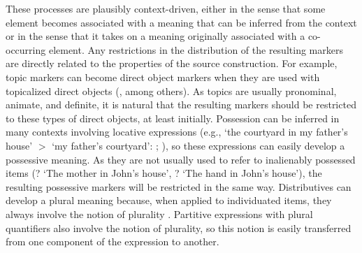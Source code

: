 \documentclass[output=paper]{langsci/langscibook}
\begin{document}
These processes are plausibly  context-driven, either in the sense that some element becomes associated
with a meaning that can be inferred  from the context or in the sense
that it takes on a meaning originally associated with a co-occurring
element. Any restrictions in the distribution of the resulting markers
are directly related to the properties of the source construction.
For example, topic markers  can become direct object markers
when they are used with topicalized direct
objects  (\citealt{Iemmolo2010}, among others). As topics are usually pronominal, animate, and definite, it
is natural that the resulting markers should be restricted to these
types of direct objects, at least initially. Possession can be inferred in many contexts involving
locative expressions (e.g., `the courtyard in my
  father's house' $>$ `my father's courtyard':
  \citealt{Claudi-Heine1986};
  \citealt[chapter 6]{Heineal.1991}), so these expressions can easily
  develop a possessive meaning. As they are not
  usually used to refer to inalienably possessed items (? `The mother
  in John's house', ? `The hand in John's house'), the resulting
  possessive markers will be restricted in the same way. 
Distributives can develop a plural
  meaning because, when applied to individuated items, they
  always involve the notion of plurality
  . Partitive expressions with plural quantifiers
  also involve the notion of plurality, so this notion is easily
  transferred from one component of the expression to
  another.
\end{document}
